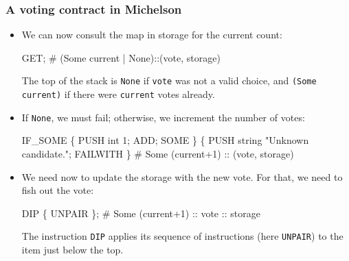 \documentclass[compress,dvips,xcolor={dvipsnames},t]{beamer}
\begin{document}
\begin{frame}[containsverbatim]
  \frametitle{A voting contract in Michelson}

  \begin{itemize}

    \item We can now consult the map in storage for the current count:
\begin{semiverbatim}
GET;
# (Some current | None)::(vote, storage)
\end{semiverbatim}
      The top of the stack is \texttt{None} if \texttt{vote} was not a
      valid choice, and \texttt{(Some current)} if there were
      \texttt{current} votes already.
    \item If \texttt{None}, we must fail; otherwise, we increment the
      number of votes:
\begin{semiverbatim}
IF\_SOME \{ PUSH int 1; ADD; SOME \}
   \{ PUSH string "Unknown candidate."; FAILWITH \}
# Some (current+1) :: (vote, storage)
\end{semiverbatim}

    \item We need now to update the storage with the new vote. For
      that, we need to fish out the vote:
\begin{semiverbatim}
DIP \{ UNPAIR \};
# Some (current+1) :: vote :: storage
\end{semiverbatim}
      The instruction \texttt{DIP} applies its sequence of
      instructions (here \texttt{UNPAIR}) to the item just below the
      top.

  \end{itemize}

\end{frame}
\end{document}
